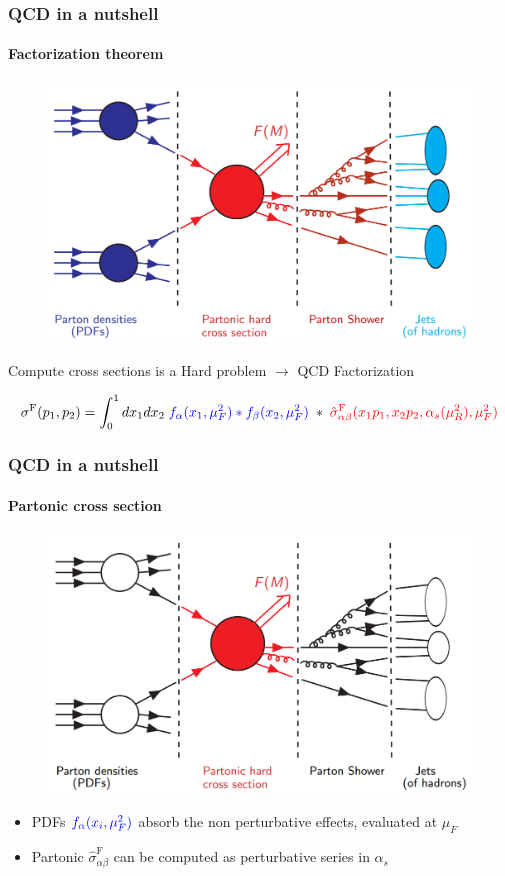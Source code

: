 \documentclass[aspectratio=43]{beamer}
\begin{document}
\begin{frame}

	\frametitle{QCD in a nutshell}
	\framesubtitle{Factorization theorem}

	\begin{figure}
		\includegraphics[width = 7 cm]{plots/factorization_1.png}
	\end{figure}
	
	Compute cross sections is a {\color{red}Hard problem} $\longrightarrow$ {\color{blue} QCD Factorization}
	
	\begin{equation}
		\sigma^{\textrm{F}}(p_{1}, p_{2}) =
		\int_{0}^{1} dx_{1} dx_{2} \; {\color{blue} f_{\alpha}(x_{1}, \mu_{F}^{2}) \ast f_{\beta}(x_{2}, \mu_{F}^{2})}
		\; \ast \;  
		{\color{red}\hat{\sigma}^{\textrm{F}}_{\alpha \beta}(x_{1}p_{1}, x_{2}p_{2}, \alpha_{s}(\mu_{R}^{2}), \mu_{F}^{2})} \nonumber
	\end{equation}

\end{frame}

\begin{frame}
	
	\frametitle{QCD in a nutshell}
	\framesubtitle{Partonic cross section}
	
	\begin{figure}
		\includegraphics[width = 7 cm]{plots/factorization_2.png}
	\end{figure}
	
	\begin{itemize}
		\item {\color{blue}PDFs} ${\color{blue} f_{\alpha}(x_{i}, \mu_{F}^{2})}$ absorb the non perturbative effects, evaluated at $\mu_{F}$
		\item Partonic {\color{red}$\hat{\sigma}^{\textrm{F}}_{\alpha \beta}$} can be computed as perturbative series in $\alpha_{s}$
	\end{itemize}
	
\end{frame}
\end{document}
